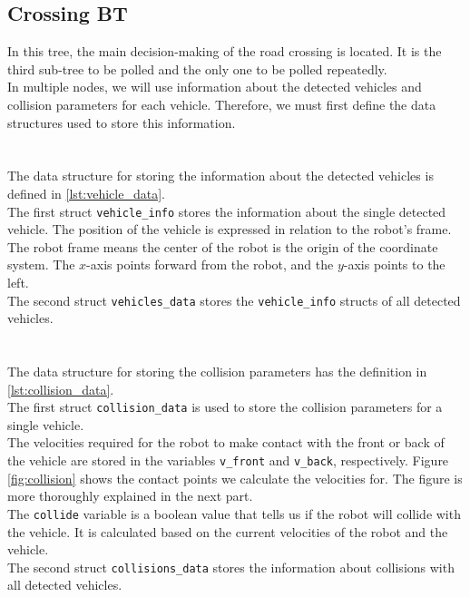 \subsection{Crossing BT}
\label{sec:Crossing-BT-impl}
    In this tree, the main decision-making of the road crossing is located. It is the third sub-tree to be polled and the only one to be polled repeatedly.\\
    In multiple nodes, we will use information about the detected vehicles and collision parameters for each vehicle. Therefore, we must first define the data structures used to store this information.\\\\
    \\
        The data structure for storing the information about the detected vehicles is defined in \ref{lst:vehicle_data}.\\
        The first struct \texttt{vehicle\_info} stores the information about the single detected vehicle. The position of the vehicle is expressed in relation to the robot's frame. The robot frame means the center of the robot is the origin of the coordinate system. The $x$-axis points forward from the robot, and the $y$-axis points to the left.\\
        The second struct \texttt{vehicles\_data} stores the \texttt{vehicle\_info} structs of all detected vehicles.\\\\
    \\
        The data structure for storing the collision parameters has the definition in \ref{lst:collision_data}.\\
        The first struct \texttt{collision\_data} is used to store the collision parameters for a single vehicle.\\
        The velocities required for the robot to make contact with the front or back of the vehicle are stored in the variables \texttt{v\_front} and \texttt{v\_back}, respectively. Figure \ref{fig:collision} shows the contact points we calculate the velocities for. The figure is more thoroughly explained in the next part.\\
        The \texttt{collide} variable is a boolean value that tells us if the robot will collide with the vehicle. It is calculated based on the current velocities of the robot and the vehicle.\\
        The second struct \texttt{collisions\_data} stores the information about collisions with all detected vehicles.\\\\

